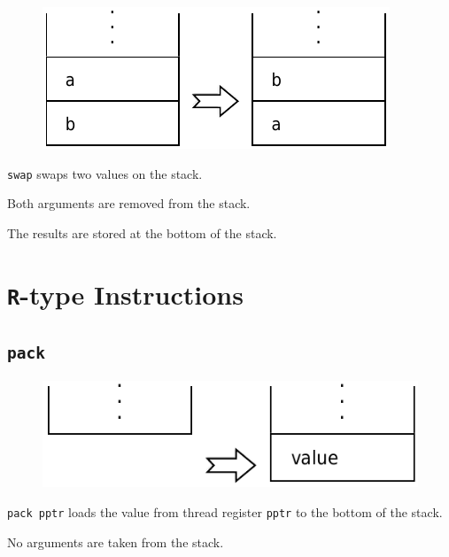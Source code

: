 		\begin{figure}
			\begin{flushright}
				\includegraphics[width=\linewidth]{figure/pdf/i_swap} 
			\end{flushright}
		\end{figure}
	
			\texttt{swap} swaps two values on the stack.
			
			Both arguments are removed from the stack.
			
			The results are stored at the bottom of the stack.


\section{\texttt{R}-type Instructions}

	\subsection*{\texttt{pack}}
	
		\begin{figure}
			\begin{flushright}
				\includegraphics[width=\linewidth]{figure/pdf/i_rtype} 
			\end{flushright}
		\end{figure}
	
			\texttt{pack pptr} loads the value from thread register 
			\texttt{pptr} to the bottom of the stack.
			
			No arguments are taken from the stack.
			
